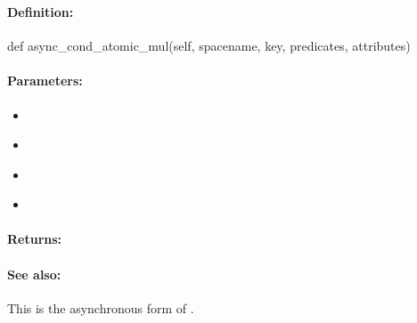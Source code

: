 \pagebreak
\subsubsection{}
\label{api:python:async_cond_atomic_mul}


\paragraph{Definition:}
\begin{pythoncode}
def async_cond_atomic_mul(self, spacename, key, predicates, attributes)
\end{pythoncode}

\paragraph{Parameters:}
\begin{itemize}[noitemsep]
\item {}\\

\item {}\\

\item {}\\

\item {}\\

\end{itemize}

\paragraph{Returns:}


\paragraph{See also:}  This is the asynchronous form of .

\pagebreak
\subsubsection{}
\label{api:python:atomic_div}


